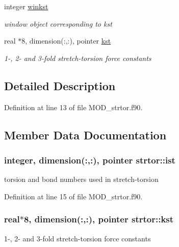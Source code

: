 \begin{DoxyCompactItemize}
integer \hyperlink{classstrtor_ad66d27416264d8558cdbbc9d9e5cc199}{winkst}
\begin{DoxyCompactList}\small\item\em window object corresponding to kst \end{DoxyCompactList}\item 
real $\ast$8, dimension(\-:,\-:), pointer \hyperlink{classstrtor_a02f766521a731413429fad98348b760d}{kst}
\begin{DoxyCompactList}\small\item\em 1-\/, 2-\/ and 3-\/fold stretch-\/torsion force constants \end{DoxyCompactList}\end{DoxyCompactItemize}


\subsection{Detailed Description}


Definition at line 13 of file M\-O\-D\-\_\-strtor.\-f90.



\subsection{Member Data Documentation}
\hypertarget{classstrtor_a20a3601a750b703431d458c6ba264647}{
\subsubsection[{ist}]{\setlength{\rightskip}{0pt plus 5cm}integer, dimension(\-:,\-:), pointer strtor\-::ist}}\label{classstrtor_a20a3601a750b703431d458c6ba264647}


torsion and bond numbers used in stretch-\/torsion 



Definition at line 15 of file M\-O\-D\-\_\-strtor.\-f90.

\hypertarget{classstrtor_a02f766521a731413429fad98348b760d}{
\subsubsection[{kst}]{\setlength{\rightskip}{0pt plus 5cm}real$\ast$8, dimension(\-:,\-:), pointer strtor\-::kst}}\label{classstrtor_a02f766521a731413429fad98348b760d}


1-\/, 2-\/ and 3-\/fold stretch-\/torsion force constants 



